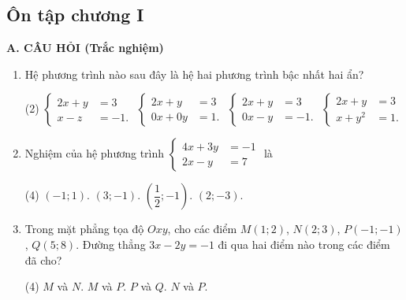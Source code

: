 \begin{practice}
    \subsection{Ôn tập chương I}

    \textbf{A. CÂU HỎI (Trắc nghiệm)}

    \begin{enumerate}
        \item Hệ phương trình nào sau đây là hệ hai phương trình bậc nhất hai ẩn?
        \begin{tasks}(2)
            \task $\left\{\begin{aligned}2x+y&=3\\x-z&=-1.\end{aligned}\right.$
            \task $\left\{\begin{aligned}2x+y&=3\\0x+0y&=1.\end{aligned}\right.$
            \task $\left\{\begin{aligned}2x+y&=3\\0x-y&=-1.\end{aligned}\right.$
            \task $\left\{\begin{aligned}2x+y&=3\\x+y^2&=1.\end{aligned}\right.$
        \end{tasks}
        \par\noindent\answerbox\par

        \item Nghiệm của hệ phương trình
        $\left\{\begin{aligned}4x+3y&=-1\\2x-y&=7\end{aligned}\right.$ là
        \begin{tasks}(4)
            \task $(-1;1)$.
            \task $(3;-1)$.
            \task $\left(\dfrac{1}{2};-1\right)$.
            \task $(2;-3)$.
        \end{tasks}
        \par\noindent\answerbox\par

        \item Trong mặt phẳng tọa độ $Oxy$, cho các điểm $M(1;2)$, $N(2;3)$, $P(-1;-1)$, $Q(5;8)$. Đường thẳng $3x-2y=-1$ đi qua hai điểm nào trong các điểm đã cho?
        \begin{tasks}(4)
            \task $M$ và $N$.
            \task $M$ và $P$.
            \task $P$ và $Q$.
            \task $N$ và $P$.
        \end{tasks}
        \par\noindent\answerbox\par


\end{enumerate}
\end{practice}

